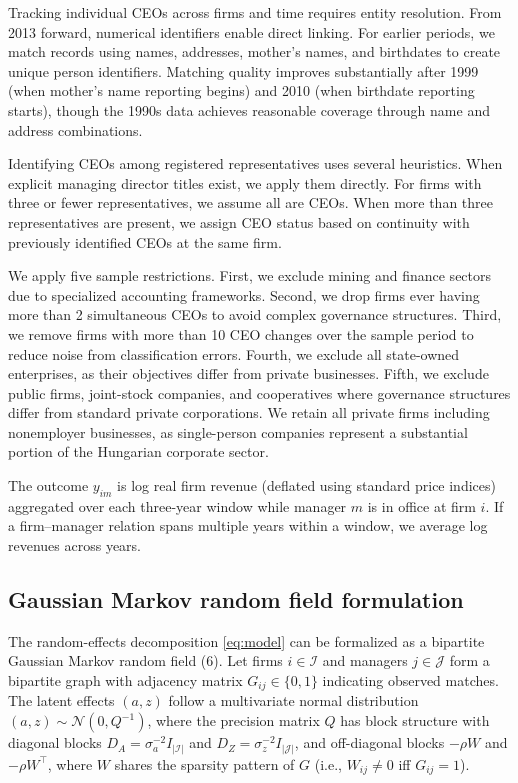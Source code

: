 \documentclass[9pt,twocolumn,twoside]{pnas-new}
\begin{document}
{Tracking individual CEOs across firms and time requires entity resolution. From 2013 forward, numerical identifiers enable direct linking. For earlier periods, we match records using names, addresses, mother's names, and birthdates to create unique person identifiers. Matching quality improves substantially after 1999 (when mother's name reporting begins) and 2010 (when birthdate reporting starts), though the 1990s data achieves reasonable coverage through name and address combinations.

Identifying CEOs among registered representatives uses several heuristics. When explicit managing director titles exist, we apply them directly. For firms with three or fewer representatives, we assume all are CEOs. When more than three representatives are present, we assign CEO status based on continuity with previously identified CEOs at the same firm.

We apply five sample restrictions. First, we exclude mining and finance sectors due to specialized accounting frameworks. Second, we drop firms ever having more than 2 simultaneous CEOs to avoid complex governance structures. Third, we remove firms with more than 10 CEO changes over the sample period to reduce noise from classification errors. Fourth, we exclude all state-owned enterprises, as their objectives differ from private businesses. Fifth, we exclude public firms, joint-stock companies, and cooperatives where governance structures differ from standard private corporations. We retain all private firms including nonemployer businesses, as single-person companies represent a substantial portion of the Hungarian corporate sector.

The outcome $y_{im}$ is log real firm revenue (deflated using standard price indices) aggregated over each three-year window while manager $m$ is in office at firm $i$. If a firm--manager relation spans multiple years within a window, we average log revenues across years.

\subsection*{Gaussian Markov random field formulation}

The random-effects decomposition \eqref{eq:model} can be formalized as a bipartite Gaussian Markov random field (6). Let firms $i \in \mathcal{I}$ and managers $j \in \mathcal{J}$ form a bipartite graph with adjacency matrix $G_{ij} \in \{0,1\}$ indicating observed matches. The latent effects $(a,z)$ follow a multivariate normal distribution $(a,z) \sim \mathcal{N}(0, Q^{-1})$, where the precision matrix $Q$ has block structure with diagonal blocks $D_A = \sigma_a^{-2} I_{|\mathcal{I}|}$ and $D_Z = \sigma_z^{-2} I_{|\mathcal{J}|}$, and off-diagonal blocks $-\rho W$ and $-\rho W^\top$, where $W$ shares the sparsity pattern of $G$ (i.e., $W_{ij}\neq 0$ iff $G_{ij}=1$).

}
\end{document}
